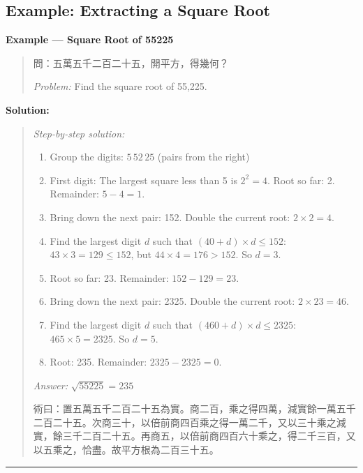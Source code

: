 \documentclass[11pt,a4paper]{article}
\newcommand{\longline}{\noindent\rule{\textwidth}{0.4pt}}
\newcommand{\zh}[1]{{#1}}
\newenvironment{chproblem}[1][]{%
  \par\medskip\noindent\textbf{\textcolor{sectioncolor}{#1}}\par\nopagebreak
  \begin{quote}\small
}{%
  \end{quote}\medskip
}
\newenvironment{chsolution}{%
  \par\medskip\noindent\textbf{\textcolor{notecolor}{Solution:}}\par\nopagebreak
  \begin{quote}\small
}{%
  \end{quote}\medskip
}
\newenvironment{stepbystep}{%
  \par\smallskip\noindent\textit{Step-by-step solution:}\par\nopagebreak
  \begin{enumerate}[leftmargin=2em,label=\textbf{Step \arabic*:},ref=\arabic*]
}{%
  \end{enumerate}\medskip
}
\begin{document}
\subsection{Example: Extracting a Square Root}

\begin{chproblem}[Example --- Square Root of 55225]
\zh{問：五萬五千二百二十五，開平方，得幾何？}

\medskip
\textit{Problem:} Find the square root of 55,225.
\end{chproblem}

\begin{chsolution}
\begin{stepbystep}
\item Group the digits: $5\,52\,25$ (pairs from the right)

\item First digit: The largest square less than 5 is $2^2 = 4$.
Root so far: 2. Remainder: $5 - 4 = 1$.

\item Bring down the next pair: 152. Double the current root: $2 \times 2 = 4$.

\item Find the largest digit $d$ such that $(40 + d) \times d \leq 152$:
$43 \times 3 = 129 \leq 152$, but $44 \times 4 = 176 > 152$. So $d = 3$.

\item Root so far: 23. Remainder: $152 - 129 = 23$.

\item Bring down the next pair: 2325. Double the current root: $2 \times 23 = 46$.

\item Find the largest digit $d$ such that $(460 + d) \times d \leq 2325$:
$465 \times 5 = 2325$. So $d = 5$.

\item Root: 235. Remainder: $2325 - 2325 = 0$.
\end{stepbystep}

\textit{Answer:} $\sqrt{55225} = 235$

\zh{術曰：置五萬五千二百二十五為實。商二百，乘之得四萬，減實餘一萬五千二百二十五。次商三十，以倍前商四百乘之得一萬二千，又以三十乘之減實，餘三千二百二十五。再商五，以倍前商四百六十乘之，得二千三百，又以五乘之，恰盡。故平方根為二百三十五。}
\end{chsolution}

\medskip
\longline

\newpage
\end{document}
